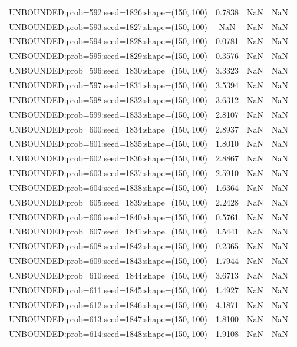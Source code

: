 \begin{longtable}{lccc}
UNBOUNDED:prob=592:seed=1826:shape=(150, 100) &  0.7838 &   NaN &    NaN \\
UNBOUNDED:prob=593:seed=1827:shape=(150, 100) &     NaN &   NaN &    NaN \\
UNBOUNDED:prob=594:seed=1828:shape=(150, 100) &  0.0781 &   NaN &    NaN \\
UNBOUNDED:prob=595:seed=1829:shape=(150, 100) &  0.3576 &   NaN &    NaN \\
UNBOUNDED:prob=596:seed=1830:shape=(150, 100) &  3.3323 &   NaN &    NaN \\
UNBOUNDED:prob=597:seed=1831:shape=(150, 100) &  3.5394 &   NaN &    NaN \\
UNBOUNDED:prob=598:seed=1832:shape=(150, 100) &  3.6312 &   NaN &    NaN \\
UNBOUNDED:prob=599:seed=1833:shape=(150, 100) &  2.8107 &   NaN &    NaN \\
UNBOUNDED:prob=600:seed=1834:shape=(150, 100) &  2.8937 &   NaN &    NaN \\
UNBOUNDED:prob=601:seed=1835:shape=(150, 100) &  1.8010 &   NaN &    NaN \\
UNBOUNDED:prob=602:seed=1836:shape=(150, 100) &  2.8867 &   NaN &    NaN \\
UNBOUNDED:prob=603:seed=1837:shape=(150, 100) &  2.5910 &   NaN &    NaN \\
UNBOUNDED:prob=604:seed=1838:shape=(150, 100) &  1.6364 &   NaN &    NaN \\
UNBOUNDED:prob=605:seed=1839:shape=(150, 100) &  2.2428 &   NaN &    NaN \\
UNBOUNDED:prob=606:seed=1840:shape=(150, 100) &  0.5761 &   NaN &    NaN \\
UNBOUNDED:prob=607:seed=1841:shape=(150, 100) &  4.5441 &   NaN &    NaN \\
UNBOUNDED:prob=608:seed=1842:shape=(150, 100) &  0.2365 &   NaN &    NaN \\
UNBOUNDED:prob=609:seed=1843:shape=(150, 100) &  1.7944 &   NaN &    NaN \\
UNBOUNDED:prob=610:seed=1844:shape=(150, 100) &  3.6713 &   NaN &    NaN \\
UNBOUNDED:prob=611:seed=1845:shape=(150, 100) &  1.4927 &   NaN &    NaN \\
UNBOUNDED:prob=612:seed=1846:shape=(150, 100) &  4.1871 &   NaN &    NaN \\
UNBOUNDED:prob=613:seed=1847:shape=(150, 100) &  1.8100 &   NaN &    NaN \\
UNBOUNDED:prob=614:seed=1848:shape=(150, 100) &  1.9108 &   NaN &    NaN \\

\end{longtable}
